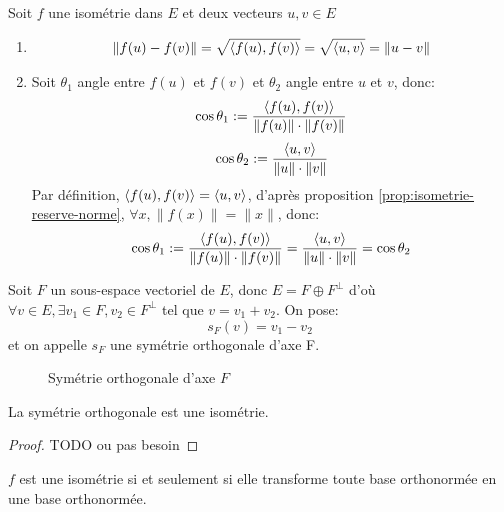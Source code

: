 \begin{preuve}
   Soit $f$ une isométrie dans  $E$ et deux vecteurs  $u, v \in E$ 
   \begin{enumerate}
       \item  
           \begin{align*}
               \|f(u) - f(v)\| = \sqrt{\left\langle f(u), f(v) \right\rangle} = \sqrt{\left\langle u, v \right\rangle} = \|u - v\| 
           \end{align*}
       \item Soit $\theta_1$ angle entre  $f(u)$ et  $f(v)$ et $\theta_2$ angle entre  $u$ et  $v$, donc:
            \[
                \cos \theta_1 := \frac{\left\langle f(u), f(v) \right\rangle}{\|f(u)\| \cdot \|f(v)\|}
           \] 
           \[
                \cos \theta_2 := \frac{\left\langle u, v \right\rangle}{\|u\| \cdot \|v\|}
           \] 
           Par définition, $\left\langle f(u), f(v) \right\rangle = \left\langle u, v \right\rangle$, d'après proposition \ref{prop:isometrie-reserve-norme},  $\forall x, \|f(x)\| = \|x\|$, donc:
           \[
                \cos \theta_1 := \frac{\left\langle f(u), f(v) \right\rangle}{\|f(u)\| \cdot \|f(v)\|} = \frac{\left\langle u, v \right\rangle}{\|u\| \cdot \|v\|} = \cos \theta_2
           \] 
   \end{enumerate}
\end{preuve}
\begin{definition}
    Soit $F$ un sous-espace vectoriel de  $E$, donc  $E = F \oplus F^{\perp}$ d'où  $\forall v \in E, \exists v_1 \in F, v_2 \in F^{\perp}$ tel que $v = v_1 + v_2$. On pose:
    \[
    s_F(v) = v_1 - v_2
    \] 
    et on appelle $s_F$ une symétrie orthogonale d'axe F.
\end{definition}
\begin{figure}[H]
    \centering
    \caption{Symétrie orthogonale d'axe $F$}
    \label{fig:symetrie-orthogonale-axe-f}
\end{figure}
\begin{prop}
   La symétrie orthogonale est une isométrie. 
\end{prop}
\begin{proof}
   TODO ou pas besoin 
\end{proof}
\begin{prop}
   $f$ est une isométrie si et seulement si elle transforme toute base orthonormée en une base orthonormée. 
\end{prop}
